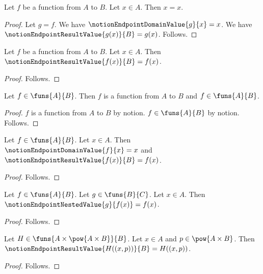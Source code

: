\begin{proposition}\label{notion_endpoint_alias}
    Let $f$ be a function from $A$ to $B$.
    Let $x\in A$.
    Then $x=x$.
\end{proposition}
\begin{proof}
    Let $g=f$.
    We have $\notionEndpointDomainValue{g}{x}=x$.
    We have $\notionEndpointResultValue{g(x)}{B}=g(x)$.
    Follows.
\end{proof}

\begin{proposition}\label{notion_endpoint_result_direct}
    Let $f$ be a function from $A$ to $B$.
    Let $x\in A$.
    Then $\notionEndpointResultValue{f(x)}{B}=f(x)$.
\end{proposition}
\begin{proof}
    Follows.
\end{proof}

\begin{proposition}\label{notion_endpoint_spelling_equivalence}
    Let $f\in\funs{A}{B}$.
    Then $f$ is a function from $A$ to $B$ and
        $f\in\funs{A}{B}$.
\end{proposition}
\begin{proof}
    $f$ is a function from $A$ to $B$ by notion.
    $f\in\funs{A}{B}$ by notion.
    Follows.
\end{proof}

\begin{proposition}\label{notion_endpoint_symbolic_direct}
    Let $f\in\funs{A}{B}$.
    Let $x\in A$.
    Then $\notionEndpointDomainValue{f}{x}=x$ and
        $\notionEndpointResultValue{f(x)}{B}=f(x)$.
\end{proposition}
\begin{proof}
    Follows.
\end{proof}

\begin{proposition}\label{notion_endpoint_symbolic_nested}
    Let $f\in\funs{A}{B}$.
    Let $g\in\funs{B}{C}$.
    Let $x\in A$.
    Then $\notionEndpointNestedValue{g}{f(x)}=f(x)$.
\end{proposition}
\begin{proof}
    Follows.
\end{proof}

\begin{proposition}\label{notion_endpoint_symbolic_product_argument}
    Let $H\in\funs{A\times\pow{A\times B}}{B}$.
    Let $x\in A$ and $p\in\pow{A\times B}$.
    Then $\notionEndpointResultValue{H((x,p))}{B}=H((x,p))$.
\end{proposition}
\begin{proof}
    Follows.
\end{proof}

